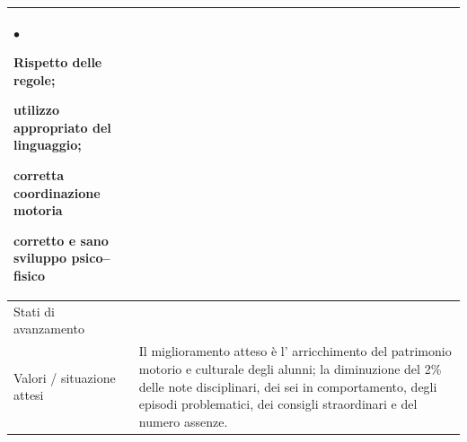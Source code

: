 \documentclass[12pt,a4paper,oneside]{memoir}
\newenvironment{elenco}{\begin{list}{$\bullet$}{%
              \setlength{\leftmargin}{4mm}%
              \setlength{\rightmargin}{1mm}%
               \setlength{\itemindent}{0mm}%
               \setlength{\labelwidth}{2mm}%
               \setlength{\labelsep}{2mm}%
              \setlength{\itemsep}{-\parsep}%
              \setlength{\partopsep}{0pt}%
              \setlength{\topsep}{0pt}%
             \setlength{\parskip}{0pt}%
              }}{\end{list}}
\begin{document}
\begin{footnotesize}
\begin{longtable}{|>{\raggedright}p{2.5cm}|>{\raggedright\arraybackslash}P{10cm}|}
\begin{elenco}
\item Rispetto delle regole;
\item utilizzo appropriato del linguaggio;
\item corretta coordinazione motoria
\item corretto e sano sviluppo psico–fisico
\end{elenco}\\[-4mm] \hline
Stati di avanzamento&\\ \hline
Valori / situazione attesi&Il miglioramento atteso è l' arricchimento del patrimonio motorio e culturale degli alunni; la diminuzione del 2\% delle note disciplinari, dei sei in comportamento, degli episodi problematici, dei consigli straordinari e del numero assenze.\\ \hline
\end{longtable}
\end{footnotesize}

\vspace{24pt}
\end{document}
